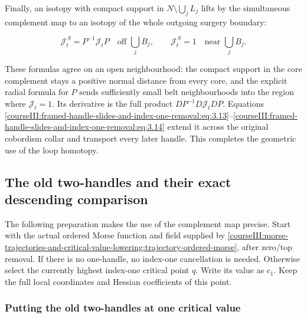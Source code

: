 Finally, an isotopy with compact support in \(N\setminus\bigcup_jL_j\) lifts by the simultaneous complement map to an isotopy of the whole outgoing surgery boundary:

\begin{equation}
\mathcal J_t^{\,S}
    =P^{-1}\mathcal J_tP
      \quad\text{off }\bigcup_jB_j,\qquad
 \mathcal J_t^{\,S}=1
      \quad\text{near }\bigcup_jB_j .
 \label{courseIII:framed-handle-slides-and-index-one-removal:eq:5.15}
\end{equation}

These formulas agree on an open neighbourhood: the compact support in the core complement stays a positive normal distance from every core, and the explicit radial formula for \(P\) sends sufficiently small belt neighbourhoods into the region where \(\mathcal J_t=1\). Its derivative is the full product \(DP^{-1}D\mathcal J_tDP\). Equations \eqref{courseIII:framed-handle-slides-and-index-one-removal:eq:3.13}--\eqref{courseIII:framed-handle-slides-and-index-one-removal:eq:3.14} extend it across the original cobordism collar and transport every later handle. This completes the geometric use of the loop homotopy.

\subsection{The old two-handles and their exact descending comparison}
\label{courseIII:framed-handle-slides-and-index-one-removal:slide-original-flow}

\label{courseIII:framed-handle-slides-and-index-one-removal:section-6}\label{courseIII:low-index-slides:6}

The following preparation makes the use of the complement map precise. Start with the actual ordered Morse function and field supplied by \cref{courseIII:morse-trajectories-and-critical-value-lowering:trajectory-ordered-morse}, after zero/top removal. If there is no one-handle, no index-one cancellation is needed. Otherwise select the currently highest index-one critical point \(q\). Write its value as \(c_1\). Keep the full local coordinates and Hessian coefficients of this point.

\subsubsection{Putting the old two-handles at one critical value}
\label{courseIII:framed-handle-slides-and-index-one-removal:section-6.1}

